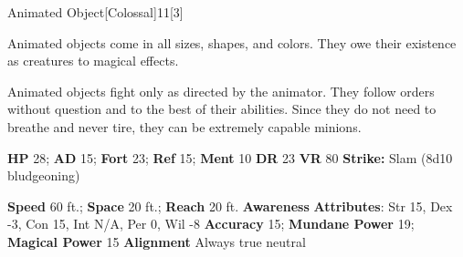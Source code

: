   \begin{monsection}{Animated Object}[Colossal]{11}[3]
    \vspace{-1em}\vspace{-1em}
    \vspace{0em}

    
    Animated objects come in all sizes, shapes, and colors. They owe their existence as creatures to magical effects.

    Animated objects fight only as directed by the animator. They follow orders without question and to the best of their abilities. Since they do not need to breathe and never tire, they can be extremely capable minions.
  
    

    \begin{spellcontent}
      \begin{spelltargetinginfo}
        \pari \textbf{HP} 28;
          \textbf{AD} 15;
          \textbf{Fort} 23;
          \textbf{Ref} 15;
          \textbf{Ment} 10
        \pari \textbf{DR} 23
        \pari \textbf{VR} 80
        \pari \textbf{Strike:}
            Slam  (8d10 bludgeoning)
      \end{spelltargetinginfo}
    \end{spellcontent}
    \begin{monsterfooter}
      \pari \textbf{Speed} 60 ft.;
        \textbf{Space} 20 ft.;
        \textbf{Reach} 20 ft.
      \pari \textbf{Awareness} 
      \pari \textbf{Attributes}:
        Str 15, Dex -3,
        Con 15, Int N/A,
        Per 0, Wil -8
      \pari \textbf{Accuracy} 15;
        \textbf{Mundane Power} 19;
      \textbf{Magical Power} 15
      \pari \textbf{Alignment} Always true neutral
    \end{monsterfooter}
  \end{monsection}
  
